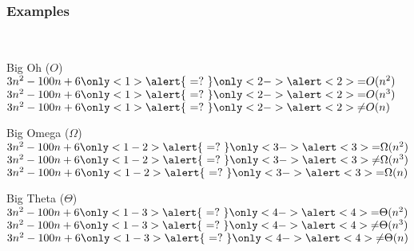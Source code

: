 \documentclass[aspectratio=169]{beamer}
\begin{document}
\begin{frame}[t]\frametitle{Examples}
    ~\\[-8mm]
    \begin{block}{Big Oh ($O$)}
        $3n^2 -100n+6 \only<1>{\alert{~{=}?~}}\only<2->{\alert<2>{=   }} O(n^2)$
      \\$3n^2 -100n+6 \only<1>{\alert{~{=}?~}}\only<2->{\alert<2>{=   }} O(n^3)$
      \\$3n^2 -100n+6 \only<1>{\alert{~{=}?~}}\only<2->{\alert<2>{\neq}} O(n)$  
    \end{block}

    \begin{block}{Big Omega ($\Omega$)}
        $3n^2 -100n+6 \only<1-2>{\alert{~{=}?~}}\only<3->{\alert<3>{=   }} \Omega(n^2)$
      \\$3n^2 -100n+6 \only<1-2>{\alert{~{=}?~}}\only<3->{\alert<3>{\neq}} \Omega(n^3)$
      \\$3n^2 -100n+6 \only<1-2>{\alert{~{=}?~}}\only<3->{\alert<3>{=   }} \Omega(n)$  
    \end{block}

    \begin{block}{Big Theta ($\Theta$)}
        $3n^2 - 100n + 6 \only<1-3>{\alert{~{=}?~}}\only<4->{\alert<4>{=   }} \Theta(n^2)$
      \\$3n^2 - 100n + 6 \only<1-3>{\alert{~{=}?~}}\only<4->{\alert<4>{\neq}} \Theta(n^3)$
      \\$3n^2 - 100n + 6 \only<1-3>{\alert{~{=}?~}}\only<4->{\alert<4>{\neq}} \Theta(n)$  
    \end{block}

\end{frame}





\end{document}
